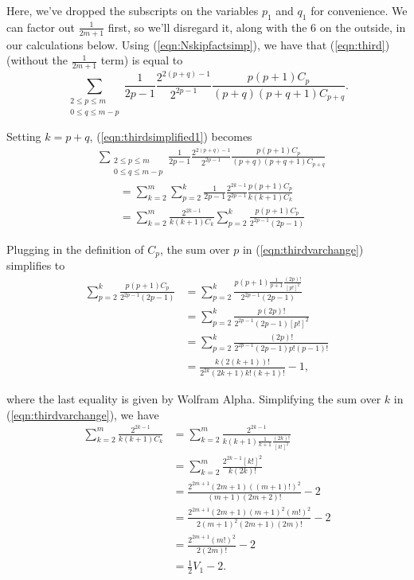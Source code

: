 \documentclass[11pt]{article}
\theoremstyle{definition}
\theoremstyle{definition}
\theoremstyle{plain}
\theoremstyle{plain}
\theoremstyle{plain}
\theoremstyle{definition}
\theoremstyle{definition}
\begin{document}
{Here, we've dropped the subscripts on the variables $p_1$ and $q_1$ for convenience. We can factor out $\frac{1}{2m+1}$ first, so we'll disregard it, along with the 6 on the outside, in our calculations below. Using (\ref{eqn:Nskipfactsimp}), we have that (\ref{eqn:third}) (without the $\frac{1}{2m+1}$ term) is equal to
\begin{equation}\label{eqn:thirdsimplified1}
\sum\limits_{\substack{2\leq p \leq m \\ 0 \leq q \leq m-p}} \frac{1}{2p-1}\frac{2^{2(p+q)-1}}{2^{2p-1}}\frac{p(p+1)C_p}{(p+q)(p+q+1)C_{p+q}}.
\end{equation}

Setting $k = p + q$, (\ref{eqn:thirdsimplified1}) becomes
\begin{equation}\label{eqn:thirdvarchange}
\begin{aligned}
&\sum\limits_{\substack{2\leq p \leq m \\ 0 \leq q \leq m-p}} \frac{1}{2p-1}\frac{2^{2(p+q)-1}}{2^{2p-1}}\frac{p(p+1)C_p}{(p+q)(p+q+1)C_{p+q}} \\
&\qquad= \sum\limits_{k=2}^m\sum\limits_{p=2}^k \frac{1}{2p-1}\frac{2^{2k-1}}{2^{2p-1}}\frac{p(p+1)C_p}{k(k+1)C_k} \\
&\qquad= \sum\limits_{k=2}^m\frac{2^{2k-1}}{k(k+1)C_k}\sum\limits_{p=2}^k\frac{p(p+1)C_p}{2^{2p-1}(2p-1)}
\end{aligned}
\end{equation}

Plugging in the definition of $C_p$, the sum over $p$ in (\ref{eqn:thirdvarchange}) simplifies to
\begin{equation}\label{eqn:thirdinnersum}
\begin{aligned}
\sum\limits_{p=2}^k\frac{p(p+1)C_p}{2^{2p-1}(2p-1)} &= \sum\limits_{p=2}^k\frac{p(p+1)\frac{1}{p+1}\frac{(2p)!}{[p!]^2}}{2^{2p-1}(2p-1)} \\
&= \sum\limits_{p=2}^k\frac{p(2p)!}{2^{2p-1}(2p-1)[p!]^2} \\
&= \sum\limits_{p=2}^k\frac{(2p)!}{2^{2p-1}(2p-1)p!(p-1)!} \\
&= \frac{k(2(k+1))!}{2^{2k}(2k+1)k!(k+1)!}-1,
\end{aligned}
\end{equation}

where the last equality is given by Wolfram Alpha. Simplifying the sum over $k$ in (\ref{eqn:thirdvarchange}), we have
\begin{equation}\label{eqn:thirdoutersum}
\begin{aligned}
\sum\limits_{k=2}^m\frac{2^{2k-1}}{k(k+1)C_k} &= \sum\limits_{k=2}^m\frac{2^{2k-1}}{k(k+1)\frac{1}{k+1}\frac{(2k)!}{[k!]^2}} \\
&= \sum\limits_{k=2}^m \frac{2^{2k-1}[k!]^2}{k(2k)!} \\
&= \frac{2^{2m+1}(2m+1)((m+1)!)^2}{(m+1)(2m+2)!}-2 \\
&= \frac{2^{2m+1}(2m+1)(m+1)^2(m!)^2}{2(m+1)^2(2m+1)(2m)!} - 2 \\
&= \frac{2^{2m+1}(m!)^2}{2(2m)!}-2 \\
&= \frac{1}{2}V_1 - 2.
\end{aligned}
\end{equation}

}
\end{document}

